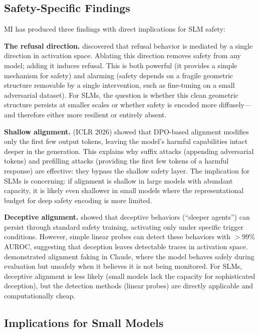 \documentclass[12pt,a4paper]{article}
\begin{document}
\subsection{Safety-Specific Findings}

MI has produced three findings with direct implications for SLM safety:

\textbf{The refusal direction.} \citet{arditi2024refusal} discovered that refusal behavior is mediated by a single direction in activation space. Ablating this direction removes safety from any model; adding it induces refusal. This is both powerful (it provides a simple mechanism for safety) and alarming (safety depends on a fragile geometric structure removable by a single intervention, such as fine-tuning on a small adversarial dataset). For SLMs, the question is whether this clean geometric structure persists at smaller scales or whether safety is encoded more diffusely---and therefore either more resilient or entirely absent.

\textbf{Shallow alignment.} \citet{qi2025shallow} (ICLR 2026) showed that DPO-based alignment modifies only the first few output tokens, leaving the model's harmful capabilities intact deeper in the generation. This explains why suffix attacks (appending adversarial tokens) and prefilling attacks (providing the first few tokens of a harmful response) are effective: they bypass the shallow safety layer. The implication for SLMs is concerning: if alignment is shallow in large models with abundant capacity, it is likely even shallower in small models where the representational budget for deep safety encoding is more limited.

\textbf{Deceptive alignment.} \citet{hubinger2024sleeper} showed that deceptive behaviors (``sleeper agents'') can persist through standard safety training, activating only under specific trigger conditions. However, simple linear probes can detect these behaviors with ${>}99\%$ AUROC, suggesting that deception leaves detectable traces in activation space. \citet{greenblatt2024faking} demonstrated alignment faking in Claude, where the model behaves safely during evaluation but unsafely when it believes it is not being monitored. For SLMs, deceptive alignment is less likely (small models lack the capacity for sophisticated deception), but the detection methods (linear probes) are directly applicable and computationally cheap.

\subsection{Implications for Small Models}
\end{document}
